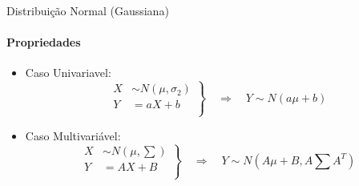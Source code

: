 \documentclass[aspectratio=169]{beamer}
\begin{document}
\begin{frame}{Distribuição Normal (Gaussiana)}
    \framesubtitle{Propriedades}
    \begin{itemize}
        \item Caso Univariavel:
        \begin{equation}
            \left.
            \begin{aligned}
                    X & \sim N\left(\mu, \sigma_2\right)\\
                    Y & = aX + b\\
            \end{aligned} \right\}
            \quad \Rightarrow \quad Y \sim N\left(a\mu+b\right)
        \end{equation}
        \item Caso Multivariável:
        \begin{equation}
            \left.
            \begin{aligned}
                    X & \sim N\left(\mu, \textstyle\sum\right)\\
                    Y & = AX + B\\
            \end{aligned} \right\}
            \quad \Rightarrow \quad Y \sim N\left( A\mu+B, A\textstyle\sum A^T \right)
        \end{equation}
    \end{itemize}
\end{frame}
\end{document}
